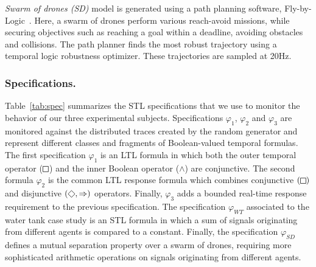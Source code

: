 \noindent \emph{Swarm of drones (SD)} model is generated using a path planning software, Fly-by-Logic~\cite{PantAM17CCTA}. Here, a swarm of drones perform various reach-avoid missions, while securing objectives such as reaching a goal within a deadline, avoiding obstacles and collisions. The path planner finds the most robust trajectory using a temporal logic robustness optimizer. These trajectories are sampled at 20Hz.

\vspace{-0.4em}
\subsubsection{Specifications.}
Table~\ref{tab:spec} summarizes the STL specifications that we use to monitor the behavior of our three experimental subjects. Specifications $\varphi_{1}$, $\varphi_{2}$ and $\varphi_{3}$ are monitored against the distributed traces created by the random generator and represent different classes and fragments of Boolean-valued temporal formulas. The first specification $\varphi_1$ is an LTL formula in which both the outer temporal operator ($\LTLg$) and the inner Boolean operator ($\wedge$) are conjunctive. The second formula $\varphi_2$ is the common LTL response formula which combines conjunctive $(\LTLg)$ and disjunctive $(\LTLf, \Rightarrow)$ operators. Finally, $\varphi_3$ adds a bounded real-time response requirement to the previous specification. The specification $\varphi_{WT}$ associated to the water tank case study is an STL formula in which a sum of signals originating from different agents is compared to a constant. Finally, the specification $\varphi_{SD}$ defines a mutual separation property over a swarm of drones, requiring more sophisticated arithmetic operations on signals originating from different agents.

